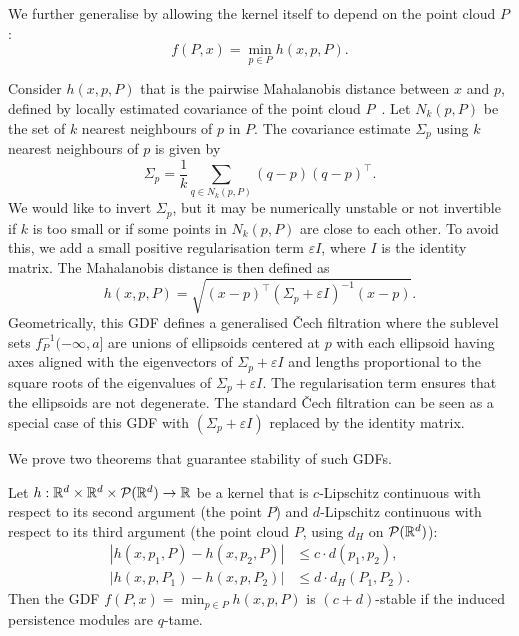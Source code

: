 We further generalise by allowing the kernel itself to depend on the point cloud
$P$:
\begin{equation}
    f(P, x) = \min_{p \in P} h(x, p, P).
\end{equation}
\begin{example}
    \label{ex:mahalanobis}
    Consider $h(x, p, P)$ that is the pairwise Mahalanobis distance between $x$
    and $p$, defined by locally estimated covariance of the point cloud
    $P$~\cite{mclachlan1999mahalanobis}.
    Let $N_k(p, P)$ be the set of $k$ nearest neighbours of $p$ in $P$. The
    covariance estimate $\Sigma_p$ using $k$ nearest neighbours of $p$ is given
    by
    \begin{equation}
        \Sigma_p = \frac{1}{k} \sum_{q \in N_k(p, P)} (q - p)(q - p)^\top.
    \end{equation}
    We would like to invert $\Sigma_p$, but it may be numerically unstable or
    not invertible if $k$ is too small or if some points in $N_k(p, P)$ are
    close to each other. To avoid this, we add a small positive
    regularisation term $\varepsilon I$, where $I$ is the identity matrix.
    The Mahalanobis distance is then defined as
    \begin{equation}
        h(x, p, P) = \sqrt{(x - p)^\top (\Sigma_p + \varepsilon I)^{-1} (x - p)}.
    \end{equation}
    Geometrically, this GDF defines a generalised \v{C}ech filtration where the
    sublevel sets $f_P^{-1}(-\infty, a]$ are unions of ellipsoids centered at
    $p$ with each ellipsoid having axes aligned with the eigenvectors of
    $\Sigma_p + \varepsilon I$ and lengths proportional to the square roots of
    the eigenvalues of $\Sigma_p + \varepsilon I$. The regularisation term
    ensures that the ellipsoids are not degenerate. The standard \v{C}ech
    filtration can be seen as a special case of this GDF with
    $(\Sigma_p + \varepsilon I)$ replaced by the identity matrix.
\end{example}
We prove two theorems that guarantee stability of such GDFs.
\begin{theorem}
    Let $h : \mathbb{R}^d \times \mathbb{R}^d \times \mathcal{P}(\mathbb{R}^d) \to \mathbb{R}$ be a kernel that
    is $c$-Lipschitz continuous with respect to its second argument (the point
    $P$) and $d$-Lipschitz continuous with respect to its third argument (the
    point cloud $P$, using $d_H$ on $\mathcal{P}(\mathbb{R}^d)$):
    \begin{align}
        |h(x, p_1, P) - h(x, p_2, P)| & \leq c \cdot d(p_1, p_2), \\
        |h(x, p, P_1) - h(x, p, P_2)| & \leq d \cdot d_H(P_1, P_2).
    \end{align}
    Then the GDF $f(P, x) = \min_{p\in P} h(x, p, P)$ is $(c + d)$-stable if
    the induced persistence modules are $q$-tame.
\end{theorem}
